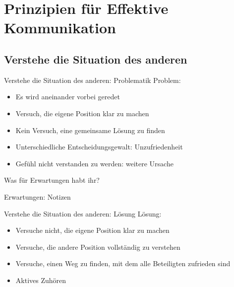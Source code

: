 \section{Prinzipien für Effektive Kommunikation}

\subsection{Verstehe die Situation des anderen}

\begin{frame}[c]{Verstehe die Situation des anderen: Problematik}
    \large
    Problem:
    \begin{itemize}[<+(1)->]
        \item Es wird aneinander vorbei geredet
        \item Versuch, die eigene Position klar zu machen
        \item Kein Versuch, eine gemeinsame Lösung zu finden
        \item Unterschiedliche Entscheidungsgewalt: Unzufriedenheit
        \item Gefühl nicht verstanden zu werden: weitere Ursache
    \end{itemize}
\end{frame}

\begin{frame}[c,standout]
    Was für Erwartungen habt ihr?
\end{frame}

\begin{frame}[c]{Erwartungen: Notizen}

\end{frame}


\begin{frame}[c]{Verstehe die Situation des anderen: Lösung}
    \large
    Lösung:
    \begin{itemize}[<+(1)->]
        \item Versuche nicht, die eigene Position klar zu machen
        \item Versuche, die andere Position vollständig zu verstehen
        \item Versuche, einen Weg zu finden, mit dem alle Beteiligten zufrieden sind
        \item Aktives Zuhören
    \end{itemize}
\end{frame}

